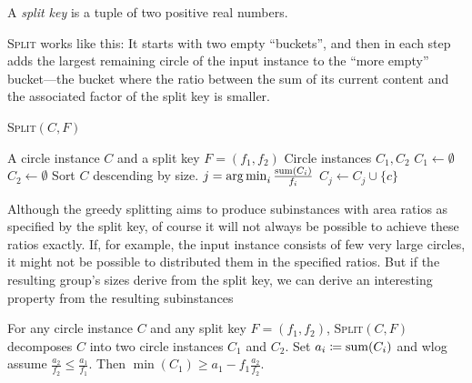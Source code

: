 \documentclass[a4paper,style=print,bibliography=totoc,nexus,lnum,extramargin]{tubsbook}
\begin{document}
\begin{definition}
    A \emph{split key} is a tuple of two positive real numbers.
\end{definition}

\textsc{Split} works like this: It starts with two empty “buckets”, and then in each step adds the largest remaining circle of the input instance to the “more empty” bucket---the bucket where the ratio between the sum of its current content and the associated factor of the split key is smaller.

\begin{algorithm}[H]
    \caption{\textsc{Split}$(C,F)$}
    \begin{algorithmic}
        \Require A circle instance $C$ and a split key $F = (f_1, f_2)$
        \Ensure Circle instances $C_1, C_2$
        \State $C_1 \gets \emptyset$
        \State $C_2 \gets \emptyset$
        \State Sort $C$ descending by size.
            \State $j = \operatorname*{arg\,min}_{i} \frac{\operatorname{sum}(C_i)}{f_i}$
            \State $C_j \gets C_j \cup \{c\}$
        \EndFor
    \end{algorithmic}
\end{algorithm}

Although the greedy splitting aims to produce subinstances with area ratios as specified by the split key, of course it will not always be possible to achieve these ratios exactly. If, for example, the input instance consists of few very large circles, it might not be possible to distributed them in the specified ratios.
But if the resulting group's sizes derive from the split key, we can derive an interesting property from the resulting subinstances 

\begin{lemma}\label{th:split-property}
    For any circle instance $C$ and any split key $F = (f_1, f_2)$, \textsc{Split}$(C,F)$ decomposes $C$ into two circle instances $C_1$ and $C_2$. Set $a_i \coloneqq \operatorname{sum}(C_i)$ and wlog assume $\frac{a_2}{f_2} \le \frac{a_1}{f_1}$.
    Then $\min(C_1) \ge a_1 - f_1\frac{a_2}{f_2}$.


\end{lemma}
\end{document}

